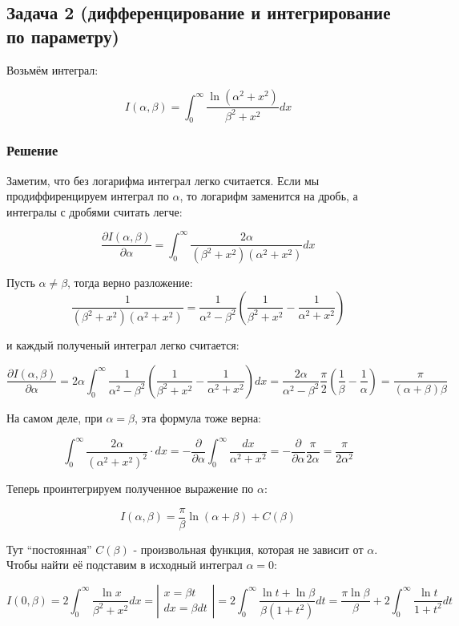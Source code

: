 \documentclass[a4paper,12pt]{article}
\begin{document}
\subsection*{Задача 2 (дифференцирование и интегрирование по параметру)}

Возьмём интеграл:

\[
I(\alpha,\beta)=\int_{0}^{\infty}\frac{\ln(\alpha^{2}+x^{2})}{\beta^{2}+x^{2}}dx
\]



\subsubsection*{Решение}

Заметим, что без логарифма интеграл легко считается. Если мы продиффиренцируем
интеграл по $\alpha$, то логарифм заменится на дробь, а интегралы
с дробями считать легче:

\[
\frac{\partial I(\alpha,\beta)}{\partial\alpha}=\int_{0}^{\infty}\frac{2\alpha}{(\beta^{2}+x^{2})(\alpha^{2}+x^{2})}dx
\]

\noindent
Пусть $\alpha\neq\beta$, тогда верно разложение: 
\[
\frac{1}{(\beta^{2}+x^{2})(\alpha^{2}+x^{2})}=\frac{1}{\alpha^{2}-\beta^{2}}\left(\frac{1}{\beta^{2}+x^{2}}-\frac{1}{\alpha^{2}+x^{2}}\right)
\]

\noindent
и каждый полученый интеграл легко считается:

\[
\frac{\partial I(\alpha,\beta)}{\partial\alpha}=2\alpha\int_{0}^{\infty}\frac{1}{\alpha^{2}-\beta^{2}}\left(\frac{1}{\beta^{2}+x^{2}}-\frac{1}{\alpha^{2}+x^{2}}\right)dx=\frac{2\alpha}{\alpha^{2}-\beta^{2}}\frac{\pi}{2}\left(\frac{1}{\beta}-\frac{1}{\alpha}\right)=\frac{\pi}{(\alpha+\beta)\beta}
\]

\noindent
На самом деле, при $\alpha=\beta$, эта формула тоже верна:

\[
\int_{0}^{\infty}\frac{2\alpha}{(\alpha^{2}+x^{2})^{2}}\cdot dx=-\frac{\partial}{\partial\alpha}\int_{0}^{\infty}\frac{dx}{\alpha^{2}+x^{2}}=-\frac{\partial}{\partial\alpha}\frac{\pi}{2\alpha}=\frac{\pi}{2\alpha^{2}}
\]

\noindent
Теперь проинтегрируем полученное выражение по $\alpha$:

\[
I(\alpha,\beta)=\frac{\pi}{\beta}\ln(\alpha+\beta)+C(\beta)
\]

\noindent
Тут ``постоянная'' $C(\beta)$ - произвольная функция, которая не
зависит от $\alpha$. Чтобы найти её подставим в исходный интеграл
$\alpha=0$:

\[
I\left(0,\beta\right)=2\int_{0}^{\infty}\frac{\ln x}{\beta^{2}+x^{2}}dx=\left|\begin{array}{c}
x=\beta t\\
dx=\beta dt
\end{array}\right|=2\int_{0}^{\infty}\frac{\ln t+\ln\beta}{\beta(1+t^{2})}dt=\frac{\pi\ln\beta}{\beta}+2\int_{0}^{\infty}\frac{\ln t}{1+t^{2}}dt
\]
\end{document}
